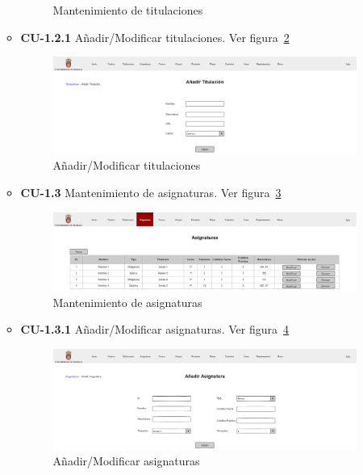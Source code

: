 \begin{itemize}
\begin{itemize}
\begin{figure}[!h]
		\caption{Mantenimiento de titulaciones}\label{F-CU1.2}
		\end{figure}
		\FloatBarrier
		\item \textbf{CU-1.2.1} Añadir/Modificar titulaciones. Ver figura~\ref{F-CU1.2.1}
		\begin{figure}[!h]
		\centering
		\includegraphics[width=\textwidth]{../img/Anexos/Vistas/add_titulacion.png}
		\caption{Añadir/Modificar titulaciones}\label{F-CU1.2.1}
		\end{figure}
		\FloatBarrier
\newpage
		\item \textbf{CU-1.3} Mantenimiento de asignaturas. Ver figura~\ref{F-CU1.3}
		\begin{figure}[!h]
		\centering
		\includegraphics[width=\textwidth]{../img/Anexos/Vistas/asignaturas.png}
		\caption{Mantenimiento de asignaturas}\label{F-CU1.3}
		\end{figure}
		\FloatBarrier
		\item \textbf{CU-1.3.1} Añadir/Modificar asignaturas. Ver figura~\ref{F-CU1.3.1}
		\begin{figure}[!h]
		\centering
		\includegraphics[width=\textwidth]{../img/Anexos/Vistas/add_asignatura.png}
		\caption{Añadir/Modificar asignaturas}\label{F-CU1.3.1}
		\end{figure}
		\FloatBarrier
	\end{itemize}
	

\end{itemize}
